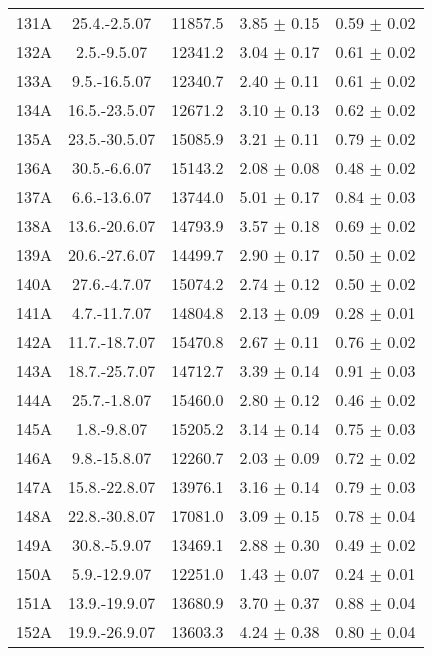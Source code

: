 \documentclass[a4paper,12pt]{article}
\begin{document}
\begin{center}
\begin{longtable}{|c|c|c|c|c|}
    131A &      25.4.-2.5.07    &       11857.5 &       3.85 $\pm$ 0.15 &       0.59 $\pm$ 0.02 \\
    132A &      2.5.-9.5.07     &       12341.2 &       3.04 $\pm$ 0.17 &       0.61 $\pm$ 0.02 \\
    133A &      9.5.-16.5.07    &       12340.7 &       2.40 $\pm$ 0.11 &       0.61 $\pm$ 0.02 \\
    134A &      16.5.-23.5.07   &       12671.2 &       3.10 $\pm$ 0.13 &       0.62 $\pm$ 0.02 \\
    135A &      23.5.-30.5.07   &       15085.9 &       3.21 $\pm$ 0.11 &       0.79 $\pm$ 0.02 \\
    136A &      30.5.-6.6.07    &       15143.2 &       2.08 $\pm$ 0.08 &       0.48 $\pm$ 0.02 \\
    137A &      6.6.-13.6.07    &       13744.0 &       5.01 $\pm$ 0.17 &       0.84 $\pm$ 0.03 \\
    138A &      13.6.-20.6.07   &       14793.9 &       3.57 $\pm$ 0.18 &       0.69 $\pm$ 0.02 \\
    139A &      20.6.-27.6.07   &       14499.7 &       2.90 $\pm$ 0.17 &       0.50 $\pm$ 0.02 \\
    140A &      27.6.-4.7.07    &       15074.2 &       2.74 $\pm$ 0.12 &       0.50 $\pm$ 0.02 \\
    141A &      4.7.-11.7.07    &       14804.8 &       2.13 $\pm$ 0.09 &       0.28 $\pm$ 0.01 \\
    142A &      11.7.-18.7.07   &       15470.8 &       2.67 $\pm$ 0.11 &       0.76 $\pm$ 0.02 \\
    143A &      18.7.-25.7.07   &       14712.7 &       3.39 $\pm$ 0.14 &       0.91 $\pm$ 0.03 \\
    144A &      25.7.-1.8.07    &       15460.0 &       2.80 $\pm$ 0.12 &       0.46 $\pm$ 0.02 \\
    145A &      1.8.-9.8.07     &       15205.2 &       3.14 $\pm$ 0.14 &       0.75 $\pm$ 0.03 \\
    146A &      9.8.-15.8.07    &       12260.7 &       2.03 $\pm$ 0.09 &       0.72 $\pm$ 0.02 \\
    147A &      15.8.-22.8.07   &       13976.1 &       3.16 $\pm$ 0.14 &       0.79 $\pm$ 0.03 \\
    148A &      22.8.-30.8.07   &       17081.0 &       3.09 $\pm$ 0.15 &       0.78 $\pm$ 0.04 \\
    149A &      30.8.-5.9.07    &       13469.1 &       2.88 $\pm$ 0.30 &       0.49 $\pm$ 0.02 \\
    150A &      5.9.-12.9.07    &       12251.0 &       1.43 $\pm$ 0.07 &       0.24 $\pm$ 0.01 \\
    151A &      13.9.-19.9.07   &       13680.9 &       3.70 $\pm$ 0.37 &       0.88 $\pm$ 0.04 \\
    152A &      19.9.-26.9.07   &       13603.3 &       4.24 $\pm$ 0.38 &       0.80 $\pm$ 0.04 \\

  \end{longtable}
\end{center}
\end{document}
